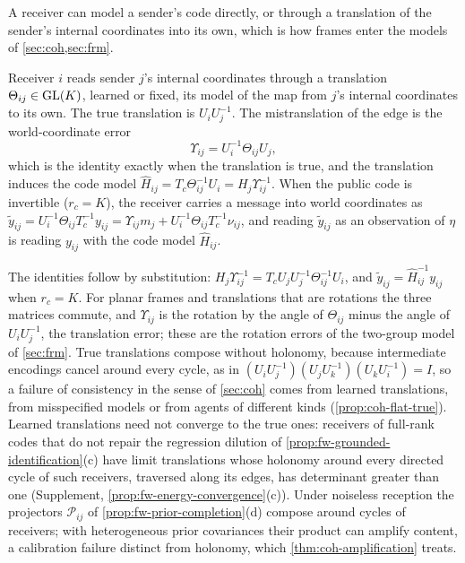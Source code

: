 A receiver can model a sender's code directly, or through a translation of the sender's internal coordinates into its own, which is how frames enter the models of \cref{sec:coh,sec:frm}.

\begin{definition}\label{def:fw-translation}
Receiver $i$ reads sender $j$'s internal coordinates through a translation $\Theta_{ij}\in\mathrm{GL}(K)$, learned or fixed, its model of the map from $j$'s internal coordinates to its own. The true translation is $U_iU_j^{-1}$. The mistranslation of the edge is the world-coordinate error
\begin{equation}\label{eq:fw-mistranslation}
\Upsilon_{ij}=U_i^{-1}\Theta_{ij}U_j,
\end{equation}
which is the identity exactly when the translation is true, and the translation induces the code model $\hat H_{ij}=T_c\Theta_{ij}^{-1}U_i=H_j\Upsilon_{ij}^{-1}$. When the public code is invertible ($r_c=K$), the receiver carries a message into world coordinates as $\tilde y_{ij}=U_i^{-1}\Theta_{ij}T_c^{-1}y_{ij}=\Upsilon_{ij}m_j+U_i^{-1}\Theta_{ij}T_c^{-1}\nu_{ij}$, and reading $\tilde y_{ij}$ as an observation of $\eta$ is reading $y_{ij}$ with the code model $\hat H_{ij}$.
\end{definition}

The identities follow by substitution: $H_j\Upsilon_{ij}^{-1}=T_cU_jU_j^{-1}\Theta_{ij}^{-1}U_i$, and $\tilde y_{ij}=\hat H_{ij}^{-1}y_{ij}$ when $r_c=K$. For planar frames and translations that are rotations the three matrices commute, and $\Upsilon_{ij}$ is the rotation by the angle of $\Theta_{ij}$ minus the angle of $U_iU_j^{-1}$, the translation error; these are the rotation errors of the two-group model of \cref{sec:frm}. True translations compose without holonomy, because intermediate encodings cancel around every cycle, as in $(U_iU_j^{-1})(U_jU_k^{-1})(U_kU_i^{-1})=I$, so a failure of consistency in the sense of \cref{sec:coh} comes from learned translations, from misspecified models or from agents of different kinds (\cref{prop:coh-flat-true}). Learned translations need not converge to the true ones: receivers of full-rank codes that do not repair the regression dilution of \cref{prop:fw-grounded-identification}(c) have limit translations whose holonomy around every directed cycle of such receivers, traversed along its edges, has determinant greater than one (Supplement, \cref{prop:fw-energy-convergence}(c)). Under noiseless reception the projectors $\mathcal P_{ij}$ of \cref{prop:fw-prior-completion}(d) compose around cycles of receivers; with heterogeneous prior covariances their product can amplify content, a calibration failure distinct from holonomy, which \cref{thm:coh-amplification} treats.

